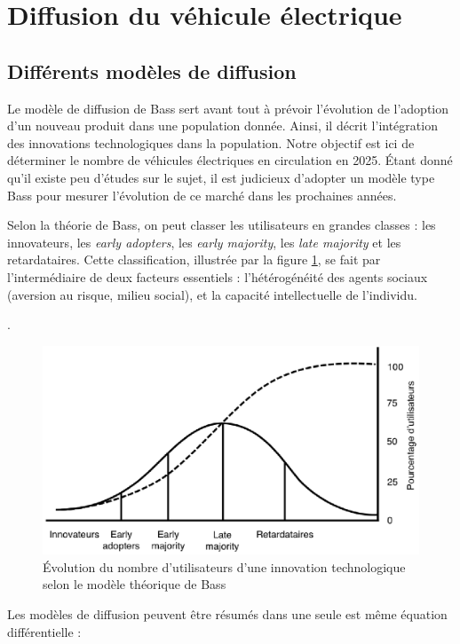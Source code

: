 \section{Diffusion du v\'ehicule \'electrique}

	\subsection{Différents modèles de diffusion}
	
		Le modèle de diffusion de Bass sert avant tout à prévoir l'évolution de l’adoption d’un nouveau produit dans une population donnée. Ainsi, il décrit l’intégration des innovations technologiques dans la population. Notre objectif est ici de déterminer le nombre de véhicules électriques en circulation en 2025. Étant donné qu'il existe peu d'études sur le sujet, il est judicieux d’adopter un modèle type Bass pour mesurer l'évolution de ce marché dans les prochaines années.
		
		
		Selon la théorie de Bass, on peut classer les utilisateurs en grandes classes : les innovateurs, les \textit{early adopters}, les \textit{early majority}, les \textit{late majority} et les retardataires. Cette classification, illustrée par la figure \ref{fig.BassUtilisateurs}, se fait par l’intermédiaire de deux facteurs essentiels : l’hétérogénéité des agents sociaux (aversion au risque, milieu social), et la capacité intellectuelle de l’individu.
		
	.
		\begin{figure}[h!]
			\caption{Évolution du nombre d'utilisateurs d'une innovation technologique selon le modèle théorique de Bass \label{fig.BassUtilisateurs}}
			\centering
			\includegraphics{fig/BassUtilisateurs.eps}
		\end{figure}
		
		Les modèles de diffusion peuvent être résumés dans une seule est même équation différentielle : 
	
